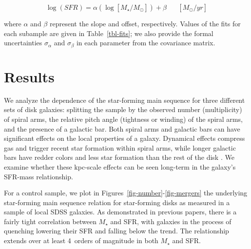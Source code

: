 \documentclass{emulateapj}
\begin{document}
\begin{equation}
\log(SFR) = \alpha(\log[M_\star/M_\odot]) + \beta \hspace{20pt}[M_\odot/yr]
\label{eqn-linearfit}
\end{equation}

\noindent where $\alpha$ and $\beta$ represent the slope and offset, respectively. Values of the fits for each subample are given in Table~\ref{tbl-fits}; we also provide the formal uncertainties $\sigma_\alpha$ and $\sigma_\beta$ in each parameter from the covariance matrix.


\section{Results} \label{sec-results}

We analyze the dependence of the star-forming main sequence for three different sets of disk galaxies: splitting the sample by the observed number (multiplicity) of spiral arms, the relative pitch angle (tightness or winding) of the spiral arms, and the presence of a galactic bar. Both spiral arms and galactic bars can have significant effects on the local properties of a galaxy. Dynamical effects compress gas and trigger recent star formation within spiral arms, while longer galactic bars have redder colors and less star formation than the rest of the disk \citep{hoy11}. We examine whether these kpc-scale effects can be seen long-term in the galaxy's SFR-mass relationship. 

For a control sample, we plot in Figures~\ref{fig-number}-\ref{fig-mergers} the underlying star-forming main sequence relation for star-forming disks as measured in a sample of local SDSS galaxies. As demonstrated in previous papers, there is a fairly tight correlation between $M_\star$ and SFR, with galaxies in the process of quenching lowering their SFR and falling below the trend. The relationship extends over at least 4~orders of magnitude in both $M_\star$ and SFR. 
\end{document}
